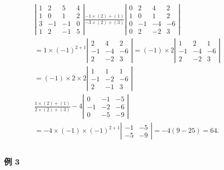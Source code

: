 \[
\begin{array}{l} \left| \begin{array}{cccc} 1 & 2 & 5 & 4 \\ 1 & 0 & 1 & 2 \\ 3 & - 1 & - 1 & 0 \\ 1 & 2 & - 1 & 5 \end{array} \right| \frac {- 1 \times (2) + (1)}{- 3 \times (2) + (3)} \left| \begin{array}{cccc} 0 & 2 & 4 & 2 \\ 1 & 0 & 1 & 2 \\ 0 & - 1 & - 4 & - 6 \\ 0 & 2 & - 2 & 3 \end{array} \right| \\ = 1 \times (- 1) ^ {2 + 1} \left| \begin{array}{ccc} 2 & 4 & 2 \\ - 1 & - 4 & - 6 \\ 2 & - 2 & 3 \end{array} \right| = (- 1) \times 2 \left| \begin{array}{ccc} 1 & 2 & 1 \\ - 1 & - 4 & - 6 \\ 2 & - 2 & 3 \end{array} \right| \\ = (- 1) \times 2 \times 2 \left| \begin{array}{ccc} 1 & 1 & 1 \\ - 1 & - 2 & - 6 \\ 2 & - 1 & 3 \end{array} \right| \\ \frac {1 \times (2) + (1)}{2 \times (2) + (3)} - 4 \left| \begin{array}{ccc} 0 & - 1 & - 5 \\ - 1 & - 2 & - 6 \\ 0 & - 5 & - 9 \end{array} \right| \\ = - 4 \times (- 1) \times (- 1) ^ {2 + 1} \left| \begin{array}{cc} - 1 & - 5 \\ - 5 & - 9 \end{array} \right| = - 4 (9 - 25) = 64. \\ \end{array}
\]

\subsubsection{例 3}

